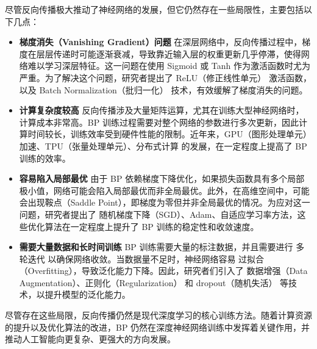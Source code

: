 尽管反向传播极大推动了神经网络的发展，但它仍然存在一些局限性，主要包括以下几点：
\begin{itemize}
\item {\bf 梯度消失（Vanishing Gradient）问题 } 在深层网络中，反向传播过程中，梯度在层层传递时可能逐渐衰减，导致靠近输入层的权重更新几乎停滞，使得网络难以学习深层特征。这一问题在使用 Sigmoid 或 Tanh 作为激活函数时尤为严重。为了解决这个问题，研究者提出了 ReLU（修正线性单元） 激活函数，以及 Batch Normalization（批归一化） 技术，有效缓解了梯度消失的问题。
\item {\bf  计算复杂度较高}
反向传播涉及大量矩阵运算，尤其在训练大型神经网络时，计算成本非常高。BP 训练过程需要对整个网络的参数进行多次更新，因此计算时间较长，训练效率受到硬件性能的限制。近年来，GPU（图形处理单元）加速、TPU（张量处理单元）、分布式计算 的发展，在一定程度上提高了 BP 训练的效率。
\item {\bf 容易陷入局部最优}
由于 BP 依赖梯度下降优化，如果损失函数具有多个局部极小值，网络可能会陷入局部最优而非全局最优。此外，在高维空间中，可能会出现鞍点（Saddle Point），即梯度为零但并非全局最优的情况。为应对这一问题，研究者提出了 随机梯度下降（SGD）、Adam、自适应学习率方法，这些优化算法在一定程度上提升了 BP 训练的稳定性和收敛速度。
\item {\bf 需要大量数据和长时间训练}
BP 训练需要大量的标注数据，并且需要进行 多轮迭代 以确保网络收敛。当数据量不足时，神经网络容易 过拟合（Overfitting），导致泛化能力下降。因此，研究者们引入了 数据增强（Data Augmentation）、正则化（Regularization） 和 dropout（随机失活） 等技术，以提升模型的泛化能力。
\end{itemize}
尽管存在这些局限，反向传播仍然是现代深度学习的核心训练方法。随着计算资源的提升以及优化算法的改进，BP 仍然在深度神经网络训练中发挥着关键作用，并推动人工智能向更复杂、更强大的方向发展。
